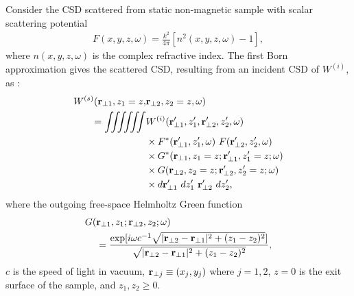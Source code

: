 \documentclass[%
 reprint,
 amsmath,amssymb,
 aps,
]{revtex4-1}
\begin{document}
Consider the CSD scattered from static non-magnetic sample with scalar scattering potential \cite{Wolf1969,wolf_thin_book}
\begin{equation}
\begin{aligned}
\label{eq:ScatteringPotential}
F(x,y,z,\omega)=\frac{k^2}{4\pi}[n^2(x,y,z,\omega)-1],
\end{aligned}
\end{equation}
where $n(x,y,z,\omega)$ is the complex refractive index. The first Born approximation gives the scattered CSD, resulting from an incident CSD of $W^{(i)}$, as \cite{wolf_thin_book}:
\begin{equation}
\begin{aligned}
W^{(s)} ({\bf r}_{\perp 1}, z_1=z, & {\bf r}_{\perp 2},z_2=z,\omega) \\ 
=  \int \!\!\! \int \!\!\! \int \!\!\! \int \!\!\! \int \!\!\! \int &  W^{(i)}({\bf r}_{\perp 1}',z_1',{\bf r}_{\perp 2}',z_2',\omega)
\\ &\times F^*({\bf r}_{\perp 1}',z_1',\omega)~F({\bf r}_{\perp 2}',z_2',\omega) \\ &\times G^*({\bf r}_{\perp 1},z_1=z;{\bf r}_{\perp 1}',z'_1=z;\omega) \\ &\times G({\bf r}_{\perp 2},z_2=z;{\bf r}_{\perp 2}',z'_2=z;\omega) \\ &\times d{\bf r}_{\perp 1}'~dz'_1~{\bf r}_{\perp 2}'~dz'_2,
\label{eq:CSDScatteringFirstBornApproximation}
\end{aligned}
\end{equation}
where the outgoing free-space Helmholtz Green function
\begin{equation}
\begin{aligned}
G( & {\bf r}_{\perp 1},z_1; {\bf r}_{\perp 2},z_2;\omega) \\ &=\frac{\exp[i \omega c^{-1}\sqrt{ | {\bf r}_{\perp 2}-{\bf r}_{\perp 1}|^2+(z_1-z_2)^2}]}{\sqrt{| {\bf r}_{\perp 2}-{\bf r}_{\perp 1}|^2+(z_1-z_2)^2}},
\end{aligned}
\end{equation}
$c$ is the speed of light in vacuum, ${\bf r}_{\perp j}\equiv(x_j,y_j)$ where $j=1,2$, $z=0$ is the exit surface of the sample, and $z_1,z_2\ge 0$.
\end{document}
